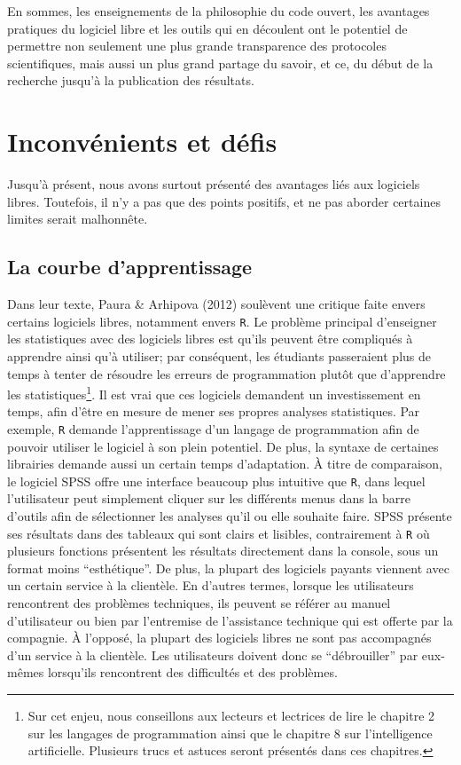 \documentclass[
  letterpaper,
  DIV=11,
  numbers=noendperiod]{scrreprt}
\begin{document}
En sommes, les enseignements de la philosophie du code ouvert, les
avantages pratiques du logiciel libre et les outils qui en découlent ont
le potentiel de permettre non seulement une plus grande transparence des
protocoles scientifiques, mais aussi un plus grand partage du savoir, et
ce, du début de la recherche jusqu'à la publication des résultats.

\hypertarget{inconvuxe9nients-et-duxe9fis}{%
\section{Inconvénients et défis}\label{inconvuxe9nients-et-duxe9fis}}

Jusqu'à présent, nous avons surtout présenté des avantages liés aux
logiciels libres. Toutefois, il n'y a pas que des points positifs, et ne
pas aborder certaines limites serait malhonnête.

\hypertarget{la-courbe-dapprentissage}{%
\subsection{La courbe d'apprentissage}\label{la-courbe-dapprentissage}}

Dans leur texte, Paura \& Arhipova (2012) soulèvent une critique faite
envers certains logiciels libres, notamment envers \texttt{R}. Le
problème principal d'enseigner les statistiques avec des logiciels
libres est qu'ils peuvent être compliqués à apprendre ainsi qu'à
utiliser; par conséquent, les étudiants passeraient plus de temps à
tenter de résoudre les erreurs de programmation plutôt que d'apprendre
les statistiques\footnote{Sur cet enjeu, nous conseillons aux lecteurs
  et lectrices de lire le chapitre 2 sur les langages de programmation
  ainsi que le chapitre 8 sur l'intelligence artificielle. Plusieurs
  trucs et astuces seront présentés dans ces chapitres.}. Il est vrai
que ces logiciels demandent un investissement en temps, afin d'être en
mesure de mener ses propres analyses statistiques. Par exemple,
\texttt{R} demande l'apprentissage d'un langage de programmation afin de
pouvoir utiliser le logiciel à son plein potentiel. De plus, la syntaxe
de certaines librairies demande aussi un certain temps d'adaptation. À
titre de comparaison, le logiciel SPSS offre une interface beaucoup plus
intuitive que \texttt{R}, dans lequel l'utilisateur peut simplement
cliquer sur les différents menus dans la barre d'outils afin de
sélectionner les analyses qu'il ou elle souhaite faire. SPSS présente
ses résultats dans des tableaux qui sont clairs et lisibles,
contrairement à \texttt{R} où plusieurs fonctions présentent les
résultats directement dans la console, sous un format moins
``esthétique''. De plus, la plupart des logiciels payants viennent avec
un certain service à la clientèle. En d'autres termes, lorsque les
utilisateurs rencontrent des problèmes techniques, ils peuvent se
référer au manuel d'utilisateur ou bien par l'entremise de l'assistance
technique qui est offerte par la compagnie. À l'opposé, la plupart des
logiciels libres ne sont pas accompagnés d'un service à la clientèle.
Les utilisateurs doivent donc se ``débrouiller'' par eux-mêmes
lorsqu'ils rencontrent des difficultés et des problèmes.
\end{document}
